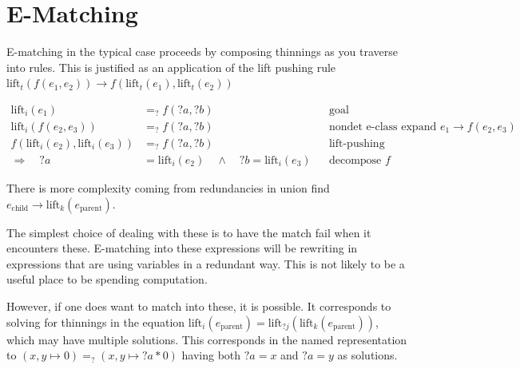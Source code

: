 \documentclass{article}%
\begin{document}
\section{E-Matching}

E-matching in the typical case proceeds by composing thinnings as you traverse into rules. This is justified as an application of the lift pushing rule $\text{lift}_t(f(e_1, e_2)) \rightarrow f(\text{lift}_t(e_1),\text{lift}_t(e_2) )$

$$
\begin{aligned}
\mathrm{lift}_i(e_1)
  &=_? f(?a, ?b)
  && \text{goal} \\
\mathrm{lift}_i(f(e_2,e_3))
  &=_? f(?a, ?b)
  && \text{nondet e-class expand } e_1 \rightarrow f(e_2,e_3) \\
f(\mathrm{lift}_i(e_2), \mathrm{lift}_i(e_3))
  &=_? f(?a, ?b)
  && \text{lift-pushing}\\
\Rightarrow \quad
?a &= \mathrm{lift}_i(e_2) \quad \land \quad
?b = \mathrm{lift}_i(e_3)
  && \text{decompose } f
\end{aligned}
$$

There is more complexity coming from redundancies in union find $e_{\text{child}} \rightarrow \text{lift}_k(e_{\text{parent}})$.

The simplest choice of dealing with these is to have the match fail when it encounters these. E-matching into these expressions will be rewriting in expressions that are using variables in a redundant way. This is not likely to be a useful place to be spending computation.

However, if one does want to match into these, it is possible. It corresponds to solving for thinnings in the equation $\text{lift}_i(e_\text{parent}) = \text{lift}_{?j}(\text{lift}_k(e_\text{parent}))$, which may have multiple solutions. This corresponds in the named representation to $(x,y \mapsto 0) =_? (x,y \mapsto ?a * 0)$ having both $?a = x$ and $?a = y$ as solutions.



\end{document}
